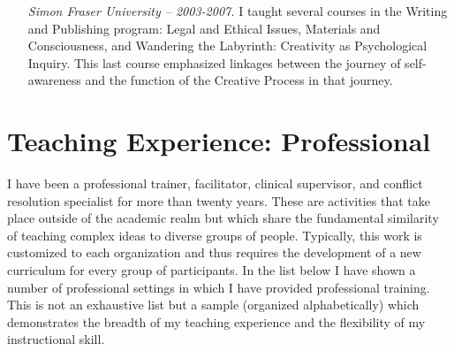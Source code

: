 \documentclass[10pt,DIV09,letterpaper,oneside,headsepline]{scrreprt}
\begin{document}
\begin{itemize}
\item [\textit{Simon Fraser University -- 2003-2007.}] I taught several courses in the Writing and Publishing program: Legal and Ethical Issues, Materials and Consciousness, and Wandering the Labyrinth: Creativity as Psychological Inquiry. This last course emphasized linkages between the  journey of self-awareness and the function of the Creative Process in that journey.

\end{itemize}

\chapter{Teaching Experience: Professional}

I have been a professional trainer, facilitator, clinical supervisor, and conflict resolution specialist for more than twenty years. These are activities that take place outside of the academic realm but which share the fundamental similarity of teaching complex ideas to diverse groups of people. Typically, this work is customized to each organization and thus requires the development of a new curriculum for every group of participants. In the list below I have shown a number of professional settings in which I have provided professional training. This is not an exhaustive list but a sample (organized alphabetically) which demonstrates the breadth of my teaching experience and the flexibility of my instructional skill.
\end{document}
